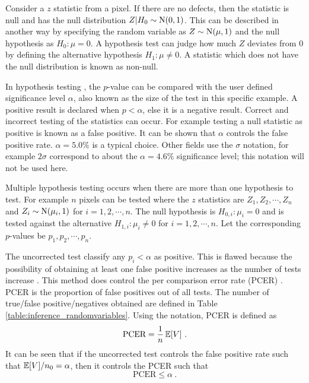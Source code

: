 Consider a $z$ statistic from a pixel. If there are no defects, then the statistic is null and has the null distribution $Z|H_0\sim\operatorname{N}(0,1)$. This can be described in another way by specifying the random variable as $Z\sim\operatorname{N}(\mu,1)$ and the null hypothesis as $H_0:\mu=0$. A hypothesis test can judge how much $Z$ deviates from 0 by defining the alternative hypothesis $H_1:\mu\neq 0$. A statistic which does not have the null distribution is known as non-null.

In hypothesis testing \cite{pearson1900on, neyman1933on, fisher1970statistical}, the $p$-value can be compared with the user defined significance level $\alpha$, also known as the size of the test in this specific example. A positive result is declared when $p<\alpha$, else it is a negative result. Correct and incorrect testing of the statistics can occur. For example testing a null statistic as positive is known as a false positive. It can be shown that $\alpha$ controls the false positive rate. $\alpha=5.0\%$ is a typical choice. Other fields use the $\sigma$ notation, for example $2\sigma$ correspond to about the $\alpha = 4.6\%$ significance level; this notation will not be used here.

Multiple hypothesis testing occurs when there are more than one hypothesis to test. For example $n$ pixels can be tested where the $z$ statistics are $Z_1, Z_2, \cdots, Z_n$ and $Z_i\sim\operatorname{N}(\mu_i,1)$ for $i=1,2,\cdots,n$. The null hypothesis is $H_{0,i}:\mu_i=0$ and is tested against the alternative $H_{1,i}:\mu_i\neq 0$ for $i=1,2,\cdots,n$. Let the corresponding $p$-values be $p_1, p_2, \cdots, p_n$.

The uncorrected test classify any $p_i<\alpha$ as positive. This is flawed because the possibility of obtaining at least one false positive increases as the number of tests increase \citep{shaffer1995multiple}. This method does control the per comparison error rate (PCER) \citep{benjamini1995controlling}. PCER is the proportion of false positives out of all tests. The number of true/false positive/negatives obtained are defined in Table \ref{table:inference_randomvariables}. Using the notation, PCER is defined as
\begin{equation}
  \text{PCER}=
  \dfrac{1}{n}
  \operatorname{\mathbb{E}}[V]
  \ .
\end{equation}
It can be seen that if the uncorrected test controls the false positive rate such that $\operatorname{\mathbb{E}}[V]/n_0 = \alpha$, then it controls the PCER such that
\begin{equation}
  \text{PCER}\leqslant\alpha \ .
\end{equation}

